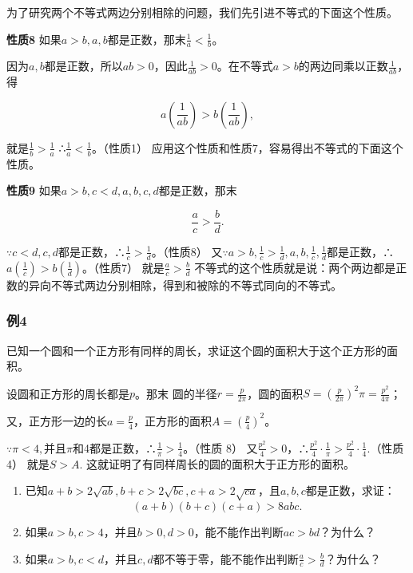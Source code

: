 为了研究两个不等式两边分别相除的问题，我们先引进不等式的下面这个性质。

\textbf{性质8}
如果\(a > b, a, b\)都是正数，那末\(\frac{1}{a} < \frac{1}{b}\)。

因为\(a, b\)都是正数，所以\(ab > 0\)，因此\(\frac{1}{ab} > 0\)。在不等式\(a > b\)的两边同乘以正数\(\frac{1}{ab}\)，得

\[
a \left(\frac{1}{a b}\right) > b \left(\frac{1}{a b}\right),
\]

就是\(\frac{1}{b} >\frac{1}{a}\) ∴\(\frac{1}{a}<\frac{1}{b}\)。（性质1）
应用这个性质和性质7，容易得出不等式的下面这个性质。

\textbf{性质9} 如果\(a > b, c < d, a, b, c, d\)都是正数，那末

\[
\frac{a}{c} > \frac{b}{d}.
\]

\(\because c < d, c, d\)都是正数，∴\(\frac{1}{c} > \frac{1}{d}\)。（性质8）
又\(\because a > b, \frac{1}{c} > \frac{1}{d}, a,b,\frac{1}{c},\frac{1}{d}\)都是正数，∴\(a\left(\frac{1}{c}\right)>b\left(\frac{1}{d}\right)\)。（性质7）
就是\(\frac{a}{c} >\frac{b}{d}\)
不等式的这个性质就是说：两个两边都是正数的异向不等式两边分别相除，得到和被除的不等式同向的不等式。

\subsubsection{例4}

已知一个圆和一个正方形有同样的周长，求证这个圆的面积大于这个正方形的面积。

 设圆和正方形的周长都是\(p\)。那末
圆的半径\(r = \frac{p}{2\pi}\)，圆的面积\(S = \left(\frac{p}{2\pi}\right)^2\pi = \frac{p^2}{4\pi}\)；

又，正方形一边的长\(a = \frac{p}{4}\)，正方形的面积\(A = \left(\frac{p}{4}\right)^2\)。

\(\because \pi<4,\)并且\(\pi\)和4都是正数，∴\(\frac{1}{\pi} > \frac{1}{4}\)。（性质
8）
又\(\frac{p^2}{4}>0\)，∴\(\frac{p^{2}}{4}\cdot\frac{1}{\pi}>\frac{p^{2}}{4}\cdot\frac{1}{4}.\)（性质
4） 就是\(S > A.\) 这就证明了有同样周长的圆的面积大于正方形的面积。

\begin{enumerate}
\item
  已知\(a + b > 2\sqrt{ab}, b + c > 2\sqrt{bc}, c + a > 2\sqrt{ca}\)，且\(a, b, c\)都是正数，求证：
\[
(a + b) (b + c) (c + a) > 8 a b c.
\]
\item
  如果\(a > b, c > 4\)，并且\(b > 0, d > 0\)，能不能作出判断\(ac > bd\)？为什么？
\item
  如果\(a > b, c < d\)，并且\(c, d\)都不等于零，能不能作出判断\(\frac{a}{c} > \frac{b}{d}\)？为什么？
\end{enumerate}

